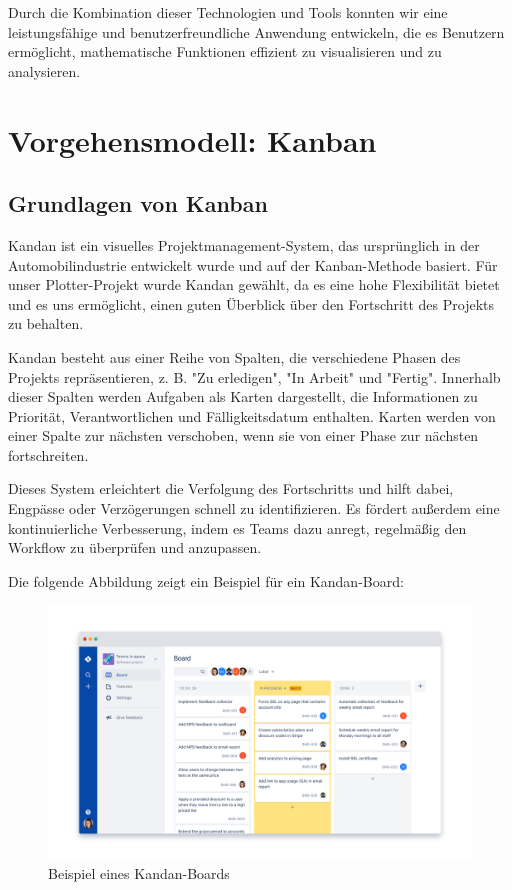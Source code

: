 \documentclass[a4paper]{article}
\begin{document}
Durch die Kombination dieser Technologien und Tools konnten wir eine leistungsfähige und benutzerfreundliche Anwendung entwickeln, die es Benutzern ermöglicht, mathematische Funktionen effizient zu visualisieren und zu analysieren.

\newpage

\section{Vorgehensmodell: Kanban}
\subsection{Grundlagen von Kanban}
Kandan ist ein visuelles Projektmanagement-System, das ursprünglich in der Automobilindustrie entwickelt wurde und auf der Kanban-Methode basiert. Für unser Plotter-Projekt wurde Kandan gewählt, da es eine hohe Flexibilität bietet und es uns ermöglicht, einen guten Überblick über den Fortschritt des Projekts zu behalten.

Kandan besteht aus einer Reihe von Spalten, die verschiedene Phasen des Projekts repräsentieren, z. B. "Zu erledigen", "In Arbeit" und "Fertig". Innerhalb dieser Spalten werden Aufgaben als Karten dargestellt, die Informationen zu Priorität, Verantwortlichen und Fälligkeitsdatum enthalten. Karten werden von einer Spalte zur nächsten verschoben, wenn sie von einer Phase zur nächsten fortschreiten.

Dieses System erleichtert die Verfolgung des Fortschritts und hilft dabei, Engpässe oder Verzögerungen schnell zu identifizieren. Es fördert außerdem eine kontinuierliche Verbesserung, indem es Teams dazu anregt, regelmäßig den Workflow zu überprüfen und anzupassen.

Die folgende Abbildung zeigt ein Beispiel für ein Kandan-Board:

\begin{figure}[h]
	\centering
	\includegraphics[width=1\textwidth]{Resources/kanban_board_example.png}
	\caption{Beispiel eines Kandan-Boards}
	\label{fig:kanban_board_example}
\end{figure}
\end{document}
